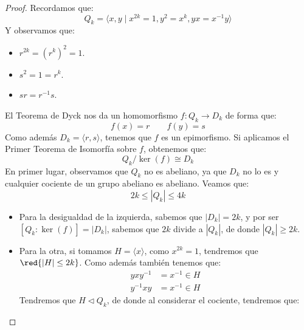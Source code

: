 \begin{ejemplo}
\begin{itemize}
\begin{proof}
                Recordamos que:
                \begin{equation*}
                    Q_k = \langle x,y \mid x^{2k} = 1, y^2 = x^k, yx=x^{-1}y \rangle 
                \end{equation*}
                Y observamos que:
                \begin{itemize}
                    \item $r^{2k} = {(r^k)}^{2} = 1$.
                    \item $s^2 = 1 = r^k$.
                    \item $sr = r^{-1}s$.
                \end{itemize}
                El Teorema de Dyck nos da un homomorfismo $f:Q_k\to D_k$ de forma que:
                \begin{equation*}
                    f(x) = r \qquad f(y) = s
                \end{equation*}
                Como además $D_k = \langle r,s \rangle $, tenemos que $f$ es un epimorfismo. Si aplicamos el Primer Teorema de Isomorfía sobre $f$, obtenemos que:
                \begin{equation*}
                    Q_k / \ker(f) \cong D_k
                \end{equation*}
                En primer lugar, observamos que $Q_k$ no es abeliano, ya que $D_k$ no lo es y cualquier cociente de un grupo abeliano es abeliano. Veamos que: 
                \begin{equation*}
                    2k \leq |Q_k| \leq 4k
                \end{equation*}
                \begin{itemize}
                    \item Para la desigualdad de la izquierda, sabemos que $|D_k| = 2k$, y por ser $[Q_k : \ker(f)] = |D_k|$, sabemos que $2k$ divide a $|Q_k|$, de donde $|Q_k| \geq 2k$.
                    \item Para la otra, si tomamos $H = \langle x \rangle $, como $x^{2k} = 1$, tendremos que $\red{|H| \leq 2k}$. Como además también tenemos que:
                        \begin{align*}
                            yxy^{-1} &= x^{-1} \in  H \\
                            y^{-1}xy &= x^{-1} \in H
                        \end{align*}
                        Tendremos que $H\lhd Q_k$, de donde al considerar el cociente, tendremos que:
                        \begin{equation*}

\end{equation*}
\end{itemize}
\end{proof}
\end{itemize}
\end{ejemplo}
